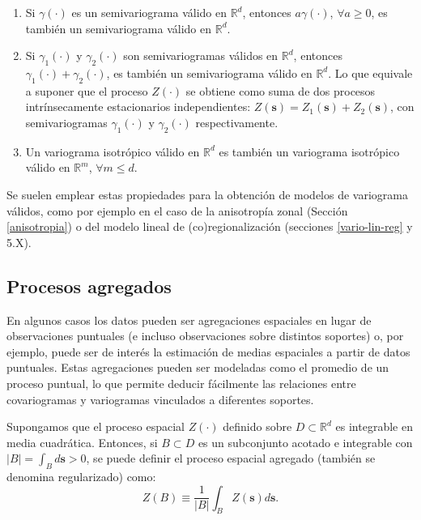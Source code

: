 \documentclass[
]{book}
\theoremstyle{break}
\theoremstyle{definition}
\theoremstyle{definition}
\theoremstyle{definition}
\theoremstyle{definition}
\theoremstyle{remark}
\begin{document}
\begin{enumerate}
\def\labelenumi{\arabic{enumi}.}
\item
  Si \(\gamma (\cdot)\) es un semivariograma válido en \(\mathbb{R}^d\), entonces \(a\gamma (\cdot)\), \(\forall a\geq 0\), es también un semivariograma válido en \(\mathbb{R}^d\).
\item
  Si \(\gamma_1 (\cdot)\) y \(\gamma_2 (\cdot)\) son semivariogramas válidos en \(\mathbb{R}^d\), entonces \(\gamma_1 (\cdot)+\gamma_2 (\cdot)\), es también un semivariograma válido en \(\mathbb{R}^d\). Lo que equivale a suponer que el proceso \(Z(\cdot)\) se obtiene como suma de dos procesos intrínsecamente estacionarios independientes: \(Z(\mathbf{s})=Z_1 (\mathbf{s})+Z_2 (\mathbf{s})\), con semivariogramas \(\gamma_1 (\cdot)\) y \(\gamma_2 (\cdot)\) respectivamente.
\item
  Un variograma isotrópico válido en \(\mathbb{R}^d\) es también un variograma isotrópico válido en \(\mathbb{R}^m\), \(\forall m\leq d\).
\end{enumerate}

Se suelen emplear estas propiedades para la obtención de modelos de variograma válidos, como por ejemplo en el caso de la anisotropía zonal (Sección \ref{anisotropia}) o del modelo lineal de (co)regionalización (secciones \ref{vario-lin-reg} y 5.X).

\subsection{Procesos agregados}\label{procesos-agregados}

En algunos casos los datos pueden ser agregaciones espaciales en lugar de observaciones puntuales (e incluso observaciones sobre distintos soportes) o, por ejemplo, puede ser de interés la estimación de medias espaciales a partir de datos puntuales.
Estas agregaciones pueden ser modeladas como el promedio de un proceso puntual, lo que permite deducir fácilmente las relaciones entre covariogramas y variogramas vinculados a diferentes soportes.

Supongamos que el proceso espacial \(Z(\cdot)\) definido sobre \(D\subset \mathbb{R} ^{d}\) es integrable en media cuadrática.
Entonces, si \(B\subset D\) es un subconjunto acotado e integrable con \(\left| B\right| =\int_B d\mathbf{s} > 0\), se puede definir el proceso espacial agregado (también se denomina regularizado) como:
\[Z(B)\equiv \dfrac{1}{\left| B\right| } \int_{B}Z(\mathbf{s})d\mathbf{s}.\]
\end{document}
